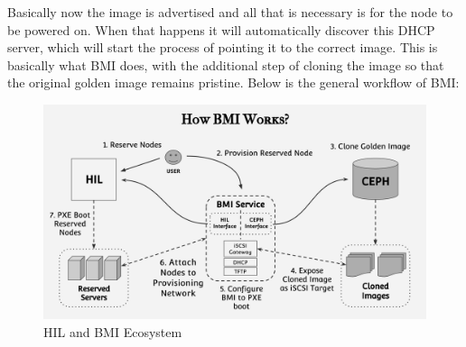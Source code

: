 
Basically now the image is advertised and all that is necessary is for the node to be powered on.  When that happens it will automatically discover this DHCP server, which will start the process of pointing it to the correct image.  This is basically what BMI does, with the additional step of cloning the image so that the original golden image remains pristine.   Below is the general workflow of BMI: \\

\begin{figure}[!h] %
\begin{center}
\includegraphics[scale=0.21]{figures/BMIFLOW.png}
\end{center}
\caption{HIL and BMI Ecosystem}
\label{fig:bmi-ecosystem}
\end{figure}



